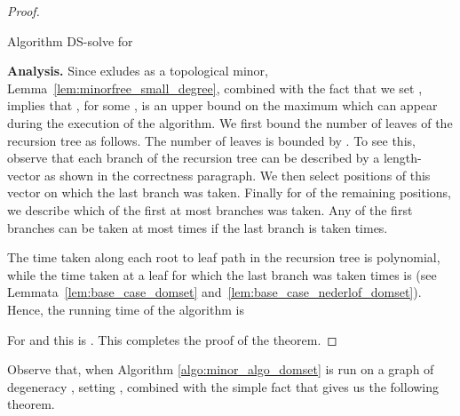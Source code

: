 \begin{proof}
\begin{algorithm}[t]
  \lIf{}{\Return }


 \BlankLine
  \caption{Algorithm {\sc DS-solve} for {\ds}}\label{algo:minor_algo_domset}
\end{algorithm}\noindent
{\bf Analysis.} 
Since  exludes  as a topological minor, Lemma~\ref{lem:minorfree_small_degree}, combined with the fact that we set , implies that , for some , is an upper bound on the maximum  which can appear during the execution of the algorithm. 
We first bound the number of leaves of the recursion tree as follows. The number of leaves is bounded by 
. To see this, observe that each branch of the recursion tree can be described by a length- vector as shown in the correctness paragraph. We then select  positions of this vector on which the last branch was taken. Finally for   of the remaining positions, we describe which of the first at most  branches was taken. Any of the first  branches can be taken at most  times if the last branch is taken  times.

The time taken along each root to leaf path in the recursion tree is polynomial, while the time taken at a leaf  for which the last branch was taken  times is  
(see Lemmata~\ref{lem:base_case_domset} and~\ref{lem:base_case_nederlof_domset}). 
Hence, the running time of the algorithm is 

For  and 
this is . This completes the proof of the theorem.

\end{proof}








\noindent
Observe that, when Algorithm \ref{algo:minor_algo_domset} is run on a graph of degeneracy , setting , combined with the simple fact that  gives us the following theorem.

